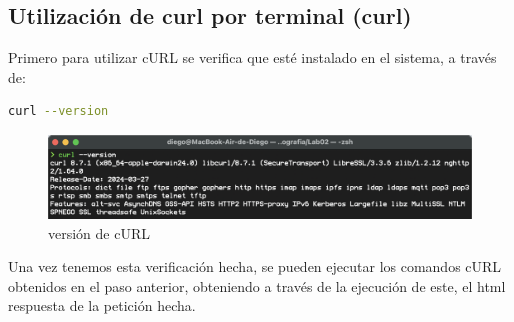 \documentclass[letter,12pt]{article}
\begin{document}
\subsection{Utilización de curl por terminal (curl)}

Primero para utilizar cURL se verifica que esté instalado en el sistema, a través de:
\begin{lstlisting}[language=bash, caption={verión de cURL}]
curl --version
\end{lstlisting}
\begin{figure}[H]
    \centering
    \includegraphics[width=1\linewidth]{Imagenes/cURL_version.png}
    \caption{versión de cURL}
    \label{fig:placeholder}
\end{figure}
Una vez tenemos esta verificación hecha, se pueden ejecutar los comandos cURL obtenidos en el paso anterior, obteniendo a través de la ejecución de este, el html respuesta de la petición hecha.
\end{document}
